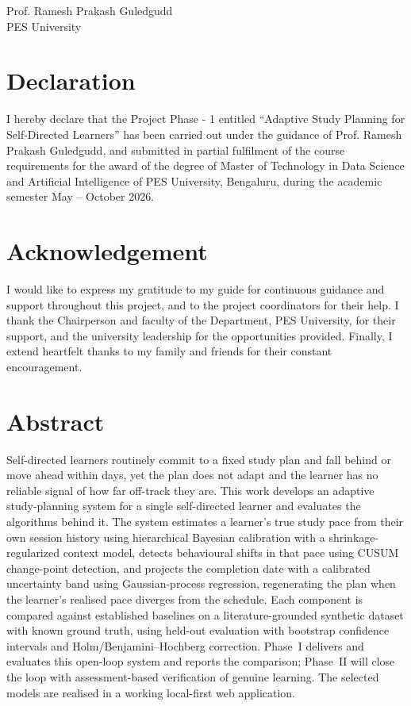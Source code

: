 \documentclass[12pt]{report}
\begin{document}
\vspace{2cm}
\begin{flushright}
Prof. Ramesh Prakash Guledgudd\\
PES University
\end{flushright}

\newpage

\section*{Declaration}
I hereby declare that the Project Phase - 1 entitled ``Adaptive Study Planning for Self-Directed Learners'' has been carried out under the guidance of Prof. Ramesh Prakash Guledgudd, and submitted in partial fulfilment of the course requirements for the award of the degree of Master of Technology in Data Science and Artificial Intelligence of PES University, Bengaluru, during the academic semester May -- October 2026.

\newpage

\section*{Acknowledgement}
I would like to express my gratitude to my guide for continuous guidance and support throughout this project, and to the project coordinators for their help. I thank the Chairperson and faculty of the Department, PES University, for their support, and the university leadership for the opportunities provided. Finally, I extend heartfelt thanks to my family and friends for their constant encouragement.

\newpage

\section*{Abstract}
Self-directed learners routinely commit to a fixed study plan and fall behind or move ahead within days, yet the plan does not adapt and the learner has no reliable signal of how far off-track they are. This work develops an adaptive study-planning system for a single self-directed learner and evaluates the algorithms behind it. The system estimates a learner's true study pace from their own session history using hierarchical Bayesian calibration with a shrinkage-regularized context model, detects behavioural shifts in that pace using CUSUM change-point detection, and projects the completion date with a calibrated uncertainty band using Gaussian-process regression, regenerating the plan when the learner's realised pace diverges from the schedule. Each component is compared against established baselines on a literature-grounded synthetic dataset with known ground truth, using held-out evaluation with bootstrap confidence intervals and Holm/Benjamini--Hochberg correction. Phase~I delivers and evaluates this open-loop system and reports the comparison; Phase~II will close the loop with assessment-based verification of genuine learning. The selected models are realised in a working local-first web application.
\end{document}
